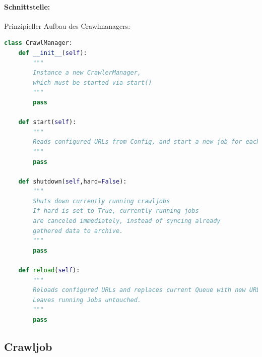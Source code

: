 \paragraph{Schnittstelle:}
\label{par:schnittstelle_}
Prinzipieller Aufbau des Crawlmanagers:
\begin{lstlisting}[language=python]
class CrawlManager:
    def __init__(self):
        """
        Instance a new CrawlerManager,
        which must be started via start()
        """
        pass

    def start(self):
        """
        Reads configured URLs from Config, and start a new job for each
        """
        pass

    def shutdown(self,hard=False): 
        """
        Shuts down currently running crawljobs
        If hard is set to True, currently running jobs
        are canceled immediately, instead of syncing already
        gathered data to archive.
        """
        pass

    def reload(self):
        """
        Reloads configured URLs and replaces current Queue with new URLs.
        Leaves running Jobs untouched.
        """
        pass

\end{lstlisting}

\newpage
\subsection{Crawljob}
\label{sub:crawljob}
